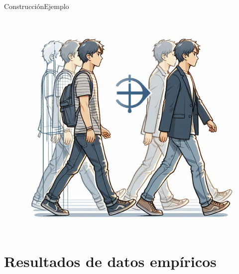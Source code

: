 \documentclass[11pt]{beamer}
\begin{document}
    \begin{frame}{Construcción}{Ejemplo}
	     \begin{figure}
		 \includegraphics[scale=0.18]{ejemPasos.jpeg}
	     \end{figure}
    \end{frame}

    

\section{Resultados de datos empíricos}
\end{document}

